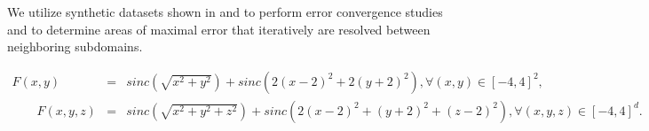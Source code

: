 We utilize synthetic datasets shown in  and  to perform error convergence studies and to determine areas of maximal error that iteratively are resolved between neighboring subdomains.

%
%
%


\begin{eqnarray}
	F(x,y)  &=& sinc(\sqrt{x^2+y^2}) + sinc(2(x - 2)^2 + 2(y + 2)^2), \forall (x,y) \in [-4,4]^2, \label{eqt:2d-synthetic}\\
	\quad \quad F(x,y,z) &=& sinc(\sqrt{x^2 + y^2 + z^2}) + sinc(2(x - 2)^2 + (y + 2)^2 + (z - 2)^2), \forall  (x,y,z) \in [-4,4]^d.
	\label{eqt:3d-synthetic}
\end{eqnarray}

